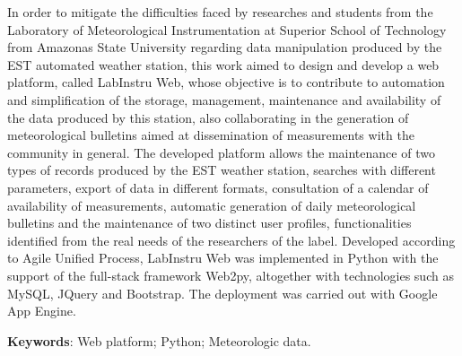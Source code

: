 
In order to mitigate the difficulties faced by researches and students from the Laboratory of Meteorological Instrumentation  at Superior School of Technology from Amazonas State University regarding data manipulation produced by the EST automated weather station, this work aimed to design and develop a web platform, called LabInstru Web, whose objective is to   contribute to automation and simplification of the storage, management, maintenance and availability of the data produced by this station, also collaborating in the generation of meteorological bulletins aimed at dissemination of measurements with the community in general. The developed platform allows the maintenance of two types of records produced by the EST weather station, searches with different parameters, export of data in different formats, consultation of a calendar of availability of measurements, automatic generation of daily meteorological bulletins and the maintenance of two distinct user profiles, functionalities identified from the real needs of the researchers of the label. Developed according to Agile Unified Process, LabInstru Web was implemented in Python with the support of the full-stack framework Web2py, altogether with technologies such as MySQL, JQuery and Bootstrap. The deployment was carried out with Google App Engine.

\noindent \textbf{Keywords}: Web platform; Python; Meteorologic data.
